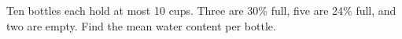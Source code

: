 Ten bottles each hold at most 10 cups. Three are 30\% full, five are 24\% full, and two are empty. Find the mean water content per bottle.
